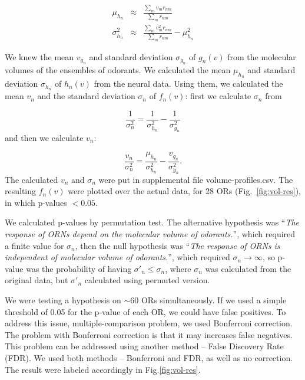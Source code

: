 \documentclass[11pt]{paper} %
\newcommand{\numberofreceptors}{ 28 }
\begin{document}
\begin{eqnarray}
	\mu_{h_n} &\approx& \frac{\displaystyle \sum_{m} v_m r_{nm}}{\displaystyle \sum_{m} r_{nm}} \\
	\sigma_{h_n}^2 &\approx& \frac{\displaystyle \sum_{m} v_m^2 r_{nm}}{\displaystyle \sum_{m} r_{nm}} - \mu_{h_n}^2
	\label{eqn:final_h}
\end{eqnarray}


We knew the mean $v_{g_n}$ and standard deviation $\sigma_{g_n}$ of $g_n(v)$ from the molecular volumes of the ensembles of odorants. 
We calculated the mean $\mu_{h_n}$ and standard deviation $\sigma_{h_n}$ of $h_n(v)$ from the neural data.
Using them, we calculated the mean $v_n$ and the standard deviation $\sigma_n$ of $f_n(v)$:
first we calculate $\sigma_n$ from 

\begin{equation}
	\frac{1}{\sigma_n^2} = \frac{1}{\sigma^2_{h_n}}  - \frac{1}{\sigma^2_{g_n}}
\end{equation}
and then we calculate $v_n$: 

\begin{equation}
	\frac{v_n}{\sigma_n^2}  =    \frac{\mu_{h_n}}{\sigma^2_{h_n}} - \frac{v_{g_n}}{\sigma^2_{g_n}}.
\end{equation}
The calculated $v_n$ and $\sigma_n$ were put in supplemental file volume-profiles.csv. 
The resulting $f_n(v)$ were plotted over the actual data, for \numberofreceptors ORs (Fig.~\ref{fig:vol-res}),
in which p-values $<0.05$. 

We calculated p-values by permutation test. 
The alternative hypothesis was
``{\it The response of ORNs depend on the molecular volume of odorants.}'', 
which required  a finite value for $\sigma_n$, 
then the null hypothesis was 
``{\it The response of ORNs is independent of molecular volume of odorants.}'',
which required $\sigma_n \rightarrow \infty$, 
so p-value was the probability of having $\sigma'_n\leq\sigma_n$, 
where $\sigma_n$ was calculated from the original data, but $\sigma'_n$ calculated using permuted version.

We were testing a hypothesis on $\sim$60 ORs simultaneously. 
If we used a simple threshold of 0.05 for the p-value of each OR, we could have false positives. 
To address this issue, multiple-comparison problem, 
we used Bonferroni correction. 
The problem with Bonferroni correction is that it may increases false negatives.
This problem can be addressed using another method -- False Discovery Rate (FDR).
We used both methods -- Bonferroni and FDR, as well as no correction. 
The result were labeled accordingly in Fig.\ref{fig:vol-res}.
\end{document}
